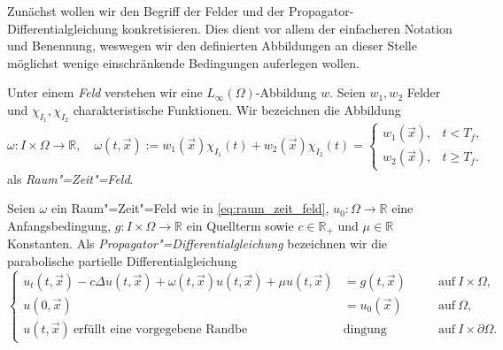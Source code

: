 Zunächst wollen wir den Begriff der Felder und der Propagator-Differentialgleichung konkretisieren.
Dies dient vor allem der einfacheren Notation und Benennung, weswegen wir den definierten Abbildungen an dieser Stelle möglichst wenige einschränkende Bedingungen auferlegen wollen.

\begin{Definition}
\label{definition:feld_raum_zeit_feld}
    Unter einem \emph{Feld} verstehen wir eine $L_{\infty}(\Omega)$-Abbildung $w$.
    Seien $w_{1}, w_{2}$ Felder und $\chi_{I_{1}}, \chi_{I_{2}}$ charakteristische Funktionen.
    Wir bezeichnen die Abbildung
    \begin{equation}
    \label{eq:raum_zeit_feld}
        \omega \colon I \times \Omega \to \mathbb{R}, \quad \omega(t, \vec{x}) :=
        w_{1}(\vec{x}) \chi_{I_{1}}(t) + w_{2}(\vec{x}) \chi_{I_{2}}(t)
        =
        \begin{cases}
            w_{1}(\vec{x}), & t < T_{f}, \\
            w_{2}(\vec{x}), & t \geq T_{f}.
        \end{cases}
    \end{equation}
    als \emph{Raum"=Zeit"=Feld}.
\end{Definition}

\begin{Definition}
\label{definition:propagator_differentialgleichung}
    Seien $\omega$ ein Raum"=Zeit"=Feld wie in \cref{eq:raum_zeit_feld}, $u_{0} \colon \Omega \to \mathbb{R}$ eine Anfangsbedingung, $g \colon I \times \Omega \to \mathbb{R}$ ein Quellterm sowie $c \in \mathbb{R}_{+}$ und $\mu \in \mathbb{R}$ Konstanten.
    Als \emph{Propagator"=Differentialgleichung} bezeichnen wir die parabolische partielle Differentialgleichung
    \begin{equation}
    \label{eq:propagator_differentialgleichung}
        \left\{
        \begin{aligned}
            u_{t}(t, \vec{x}) - c \Delta u(t, \vec{x}) + \omega(t, \vec{x}) u(t, \vec{x}) + \mu u(t, \vec{x}) &= g(t, \vec{x}) \quad &&\text{auf}~I \times \Omega,\\
            u(0, \vec{x}) &= u_{0}(\vec{x}) \quad &&\text{auf}~\Omega, \\
            u(t, \vec{x})~\text{erfüllt eine vorgegebene Randbe}&\text{dingung} &&\text{auf}~I \times \partial \Omega.
        \end{aligned}
        \right.
    \end{equation}
\end{Definition}

